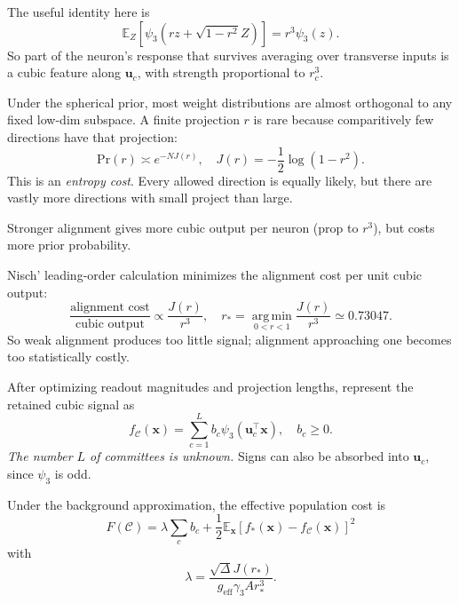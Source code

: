 \documentclass[11pt, reqno]{amsart}
\theoremstyle{notestyle}
\theoremstyle{defstyle}
\newcommand{\argmin}{\operatorname*{arg\,min}}
\begin{document}
The useful identity here is
\begin{equation}
    \mathbb E_Z \left[ \psi_3 (rz + \sqrt{1-r^2}Z)\right] = r^3 \psi_3(z).
\end{equation}
So part of the neuron's response that survives averaging over transverse inputs is a cubic feature along $\mathbf u_c$, with strength proportional to $r_c^3$. 

Under the spherical prior, most weight distributions are almost orthogonal to any fixed low-dim subspace. A finite projection $r$ is rare because comparitively few directions have that projection:
\begin{equation}
    \mathrm{Pr}(r) \asymp e^{-N J(r)},\quad J(r) = -\frac 12\log(1 - r^2).
\end{equation}
This is an \textit{entropy cost}. Every allowed direction is equally likely, but there are vastly more directions with small project than large.

Stronger alignment gives more cubic output per neuron (prop to $r^3$), but costs more prior probability. 

Nisch' leading-order calculation minimizes the alignment cost per unit cubic output:
\begin{equation}
    \frac{\text{alignment cost}}{\text{cubic output}} \propto \frac{J(r)}{r^3},\quad r_* = \argmin_{0 < r < 1} \frac{J(r)}{r^3} \simeq 0.73047.
\end{equation}
So weak alignment produces too little signal; alignment approaching one becomes too statistically costly. 

After optimizing readout magnitudes and projection lengths, represent the retained cubic signal as
\begin{equation}
    f_{\mathcal C}(\mathbf x) = \sum_{c=1}^L b_c \psi_3(\mathbf u_c^\top \mathbf x),\quad b_c \geq 0.
\end{equation}
\textit{The number $L$ of committees is unknown.} Signs can also be absorbed into $\mathbf u_c$, since $\psi_3$ is odd.

Under the background approximation, the effective population cost is
\begin{equation}
    F(\mathcal C) = \lambda \sum_c b_c + \frac 12 \mathbb E_{\mathbf x}\left[ f_*(\mathbf x) - f_{\mathcal C}(\mathbf x)\right]^2
\end{equation}
with 
\begin{equation}
    \lambda = \frac{\sqrt{\Delta}J(r_*)}{g_{\text{eff}}\gamma_3 A r_*^3}.
\end{equation}
\end{document}
